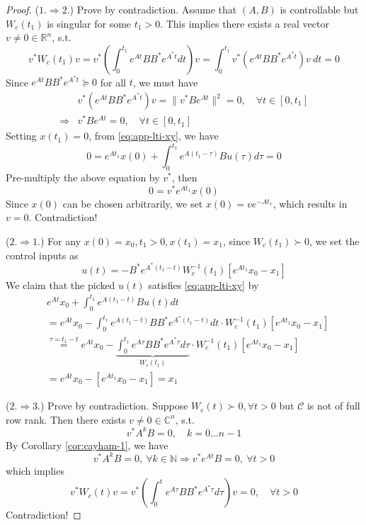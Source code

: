 \documentclass[
]{book}
\theoremstyle{definition}
\theoremstyle{definition}
\theoremstyle{definition}
\theoremstyle{definition}
\theoremstyle{remark}
\begin{document}
\begin{proof}
(\(1. \Rightarrow 2.\)) Prove by contradiction. Assume that \((A, B)\) is controllable but \(W_c(t_1)\) is singular for some \(t_1 > 0\). This implies there exists a real vector \(v \ne 0 \in \mathbb{R}^n\), s.t.
\[
   v^* W_c(t_1) v = v^* (\int_{0}^{t_1} e^{At} B B^* e^{A^*t} dt) v = \int_{0}^{t_1} v^* (e^{At} B B^* e^{A^*t}) v \ dt = 0
\]
Since \(e^{At} BB^* e^{A^*t} \succeq 0\) for all \(t\), we must have
\begin{equation*}
   \begin{split}
      & v^* (e^{At} B B^* e^{A^*t}) v = \parallel v^* B e^{At} \parallel^2 = 0, \quad \forall t \in [0, t_1] \\
      \Longrightarrow & v^* B e^{At} = 0, \quad \forall t \in [0, t_1]
   \end{split}
\end{equation*}
Setting \(x(t_1) = 0\), from \eqref{eq:app-lti-xy}, we have
\[
   0 = e^{A t_1} x(0) + \int_{0}^{t_1} e^{A (t_1 - \tau)} B u(\tau) d\tau = 0
\]
Pre-multiply the above equation by \(v^*\), then
\[
   0 = v^* e^{A t_1} x(0)
\]
Since \(x(0)\) can be chosen arbitrarily, we set \(x(0) = v e^{-A t_1}\), which results in \(v = 0\). Contradiction!

(\(2. \Rightarrow 1.\)) For any \(x(0) = x_0, t_1 > 0, x(t_1) = x_1\), since \(W_c(t_1) \succ 0\), we set the control inputs as
\[
   u(t) = -B^* e^{A^*(t_1 - t)} W_c^{-1}(t_1) [e^{At_1} x_0 - x_1]
\]
We claim that the picked \(u(t)\) satisfies \eqref{eq:app-lti-xy} by
\begin{equation*}
   \begin{split}
      & e^{At} x_0 + \int_{0}^{t_1} e^{A(t_1-t)} B u(t) dt \\
      & = e^{At} x_0 - \int_{0}^{t_1} e^{A(t_1-t)} B B^* e^{A^*(t_1-t)} dt \cdot W_c^{-1}(t_1) [e^{At_1} x_0 - x_1] \\
      & \overset{\tau = t_1-t}{=} e^{At} x_0 - \underbrace{\int_{0}^{t_1} e^{A\tau} BB^* e^{A^*\tau} d\tau}_{W_c(t_1)} \cdot W_c^{-1}(t_1) [e^{At_1} x_0 - x_1] \\
      & = e^{At} x_0 - [e^{At_1} x_0 - x_1] = x_1
   \end{split}
\end{equation*}

(\(2. \Rightarrow 3.\)) Prove by contradiction. Suppose \(W_c(t) \succ 0, \forall t > 0\) but \(\mathcal{C}\) is not of full row rank. Then there exists \(v \ne 0 \in \mathbb{C}^n\), s.t.
\[
   v^* A^k B = 0, \quad k = 0 \dots n - 1
\]
By Corollary \ref{cor:cayham-1}, we have
\[
   v^* A^k B = 0, \ \forall k \in \mathbb{N} \Longrightarrow v^* e^{At} B = 0, \ \forall t > 0
\]
which implies
\[
   v^* W_c(t) v = v^* (\int_{0}^{t} e^{A\tau} B B^* e^{A^*\tau} d\tau) v = 0, \quad \forall t > 0
\]
Contradiction!


\end{proof}
\end{document}
